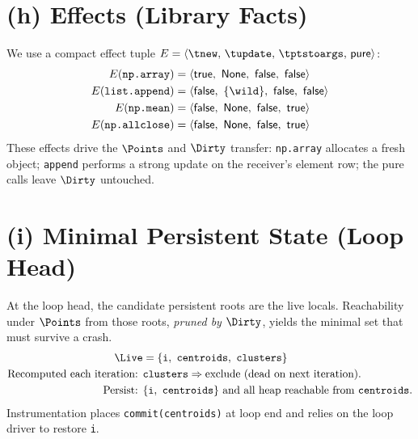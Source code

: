 \section*{(h) Effects (Library Facts)}
We use a compact effect tuple $E = \langle \tnew,\,\tupdate,\,\tptstoargs,\,\mathsf{pure}\rangle$:
\begin{align*}
E(\texttt{np.array})      &= \langle \mathsf{true},\ \mathsf{None},\ \mathsf{false},\ \mathsf{false}\rangle\\
E(\texttt{list.append})   &= \langle \mathsf{false},\ \{\wild\},\ \mathsf{false},\ \mathsf{false}\rangle\\
E(\texttt{np.mean})       &= \langle \mathsf{false},\ \mathsf{None},\ \mathsf{false},\ \mathsf{true}\rangle\\
E(\texttt{np.allclose})   &= \langle \mathsf{false},\ \mathsf{None},\ \mathsf{false},\ \mathsf{true}\rangle
\end{align*}
These effects drive the $\Points$ and $\Dirty$ transfer: \texttt{np.array} allocates a fresh object;
\texttt{append} performs a strong update on the receiver's element row; the pure calls leave $\Dirty$ untouched.

\section*{(i) Minimal Persistent State (Loop Head)}
At the loop head, the candidate persistent roots are the live locals.
Reachability under $\Points$ from those roots, \emph{pruned by $\Dirty$}, yields the minimal set that must survive a crash.
\begin{align*}
\Live &= \{\texttt{i},\ \texttt{centroids},\ \texttt{clusters}\}\\
\text{Recomputed each iteration: } &\texttt{clusters} \Rightarrow \text{exclude (dead on next iteration).}\\
\text{Persist: } &\{\texttt{i},\ \texttt{centroids}\}\ \text{and all heap reachable from }\texttt{centroids}.
\end{align*}
Instrumentation places \verb|commit(centroids)| at loop end and relies on the loop driver to restore \texttt{i}.
